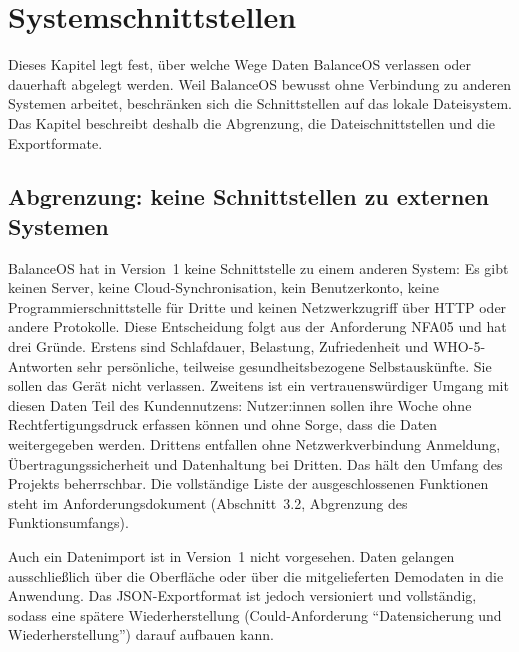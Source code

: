 \section{Systemschnittstellen}\label{sec:systemschnittstellen}
Dieses Kapitel legt fest, über welche Wege Daten BalanceOS verlassen oder dauerhaft abgelegt werden. Weil BalanceOS bewusst ohne Verbindung zu anderen Systemen arbeitet, beschränken sich die Schnittstellen auf das lokale Dateisystem. Das Kapitel beschreibt deshalb die Abgrenzung, die Dateischnittstellen und die Exportformate.

\subsection{Abgrenzung: keine Schnittstellen zu externen Systemen}
BalanceOS hat in Version~1 keine Schnittstelle zu einem anderen System: Es gibt keinen Server, keine Cloud-Synchronisation, kein Benutzerkonto, keine Programmierschnittstelle für Dritte und keinen Netzwerkzugriff über \ac{HTTP} oder andere Protokolle. Diese Entscheidung folgt aus der Anforderung NFA05 und hat drei Gründe. Erstens sind Schlafdauer, Belastung, Zufriedenheit und WHO-5-Antworten sehr persönliche, teilweise gesundheitsbezogene Selbstauskünfte. Sie sollen das Gerät nicht verlassen. Zweitens ist ein vertrauenswürdiger Umgang mit diesen Daten Teil des Kundennutzens: Nutzer:innen sollen ihre Woche ohne Rechtfertigungsdruck erfassen können und ohne Sorge, dass die Daten weitergegeben werden. Drittens entfallen ohne Netzwerkverbindung Anmeldung, Übertragungssicherheit und Datenhaltung bei Dritten. Das hält den Umfang des Projekts beherrschbar. Die vollständige Liste der ausgeschlossenen Funktionen steht im Anforderungsdokument (Abschnitt~3.2, Abgrenzung des Funktionsumfangs).

Auch ein Datenimport ist in Version~1 nicht vorgesehen. Daten gelangen ausschließlich über die Oberfläche oder über die mitgelieferten Demodaten in die Anwendung. Das JSON-Exportformat ist jedoch versioniert und vollständig, sodass eine spätere Wiederherstellung (Could-Anforderung \enquote{Datensicherung und Wiederherstellung}) darauf aufbauen kann.

